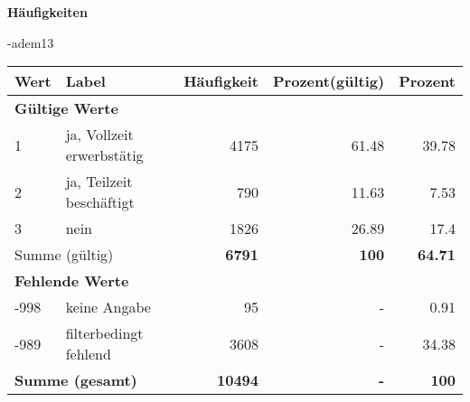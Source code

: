         		\vspace*{0.5cm}
                \noindent\textbf{Häufigkeiten}

                \vspace*{-\baselineskip}
					\begin{filecontents}{\jobname-adem13}
					\begin{longtable}{lXrrr}
					\toprule
					\textbf{Wert} & \textbf{Label} & \textbf{Häufigkeit} & \textbf{Prozent(gültig)} & \textbf{Prozent} \\
					\endhead
					\midrule
					\multicolumn{5}{l}{\textbf{Gültige Werte}}\\

					1 &
					\multicolumn{1}{X}{ ja, Vollzeit erwerbstätig   } &


					  \num{4175} &
					  \num[round-mode=places,round-precision=2]{61.48} &
					    \num[round-mode=places,round-precision=2]{39.78} \\

					2 &
					\multicolumn{1}{X}{ ja, Teilzeit beschäftigt   } &


					  \num{790} &
					  \num[round-mode=places,round-precision=2]{11.63} &
					    \num[round-mode=places,round-precision=2]{7.53} \\

					3 &
					\multicolumn{1}{X}{ nein   } &


					  \num{1826} &
					  \num[round-mode=places,round-precision=2]{26.89} &
					    \num[round-mode=places,round-precision=2]{17.4} \\
					\midrule
					\multicolumn{2}{l}{Summe (gültig)} &
					  \textbf{\num{6791}} &
					\textbf{\num{100}} &
					  \textbf{\num[round-mode=places,round-precision=2]{64.71}} \\
					\multicolumn{5}{l}{\textbf{Fehlende Werte}}\\
							-998 &
							keine Angabe &
							  \num{95} &
							 - &
							  \num[round-mode=places,round-precision=2]{0.91} \\
							-989 &
							filterbedingt fehlend &
							  \num{3608} &
							 - &
							  \num[round-mode=places,round-precision=2]{34.38} \\
					\midrule
					\multicolumn{2}{l}{\textbf{Summe (gesamt)}} &
				      \textbf{\num{10494}} &
				    \textbf{-} &
				    \textbf{\num{100}} \\
					\bottomrule
					\end{longtable}
					\end{filecontents}
